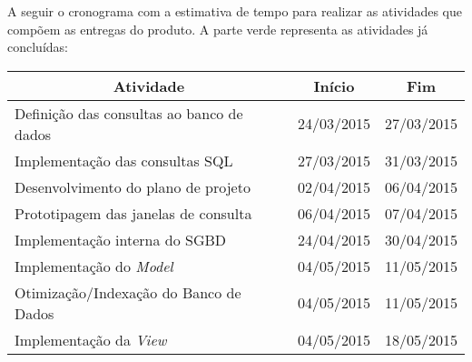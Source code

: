 \documentclass[a4paper,12pt]{article}
\begin{document}
A seguir o cronograma com a estimativa de tempo para realizar as atividades que compõem as entregas do produto. A parte verde representa as atividades já concluídas:\\


{\normalsize %

\begin{longtable}{|l|c|c|}
\hline
\multicolumn{1}{|c|}{\textbf{Atividade}}  & \multicolumn{1}{c|}{\textbf{Início}} & \multicolumn{1}{c|}{\textbf{Fim}} \\ \hline

\hline
\rowcolor{electricgreen}
Definição das consultas ao banco de dados & 24/03/2015                           & 27/03/2015                        \\ \hline

\hline
\rowcolor{electricgreen}
Implementação das consultas SQL           & 27/03/2015                           & 31/03/2015                        \\ \hline

\hline
\rowcolor{electricgreen}
Desenvolvimento do plano de projeto       & 02/04/2015                           & 06/04/2015                        \\ 

\hline
\rowcolor{electricgreen}
Prototipagem das janelas de consulta      & 06/04/2015                           & 07/04/2015                        \\ \hline

\hline
\rowcolor{electricgreen}
Implementação interna do SGBD             & 24/04/2015                           & 30/04/2015                        \\ \hline

\hline
\rowcolor{electricgreen}
Implementação do \textit{Model}           & 04/05/2015                           & 11/05/2015                        \\ \hline

\hline
\rowcolor{electricgreen}
Otimização/Indexação do Banco de Dados    & 04/05/2015                           & 11/05/2015                        \\ \hline

\hline
\rowcolor{electricgreen}
Implementação da \textit{View}            & 04/05/2015                           & 18/05/2015                        \\ \hline


\end{longtable}}
\end{document}
